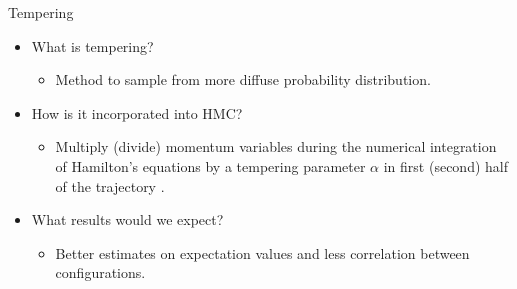 \documentclass{beamer}
\begin{document}
    \begin{frame}{Tempering}
    \begin{itemize}
            \item<1-> What is tempering? 
            \begin{itemize}
                \item<1-> Method to sample from more diffuse probability distribution.
            \end{itemize}
            \item<2-> How is it incorporated into HMC?
            \begin{itemize}
                \item<2-> Multiply (divide) momentum variables during the numerical integration of Hamilton's equations by a tempering parameter $\alpha$ in first (second) half of the trajectory \cite{neal_2011}.
            \end{itemize}
            \item<3-> What results would we expect?
            \begin{itemize}
                \item<3-> Better estimates on expectation values and less correlation between configurations.
            \end{itemize}
        \end{itemize}
    \end{frame}
\end{document}
